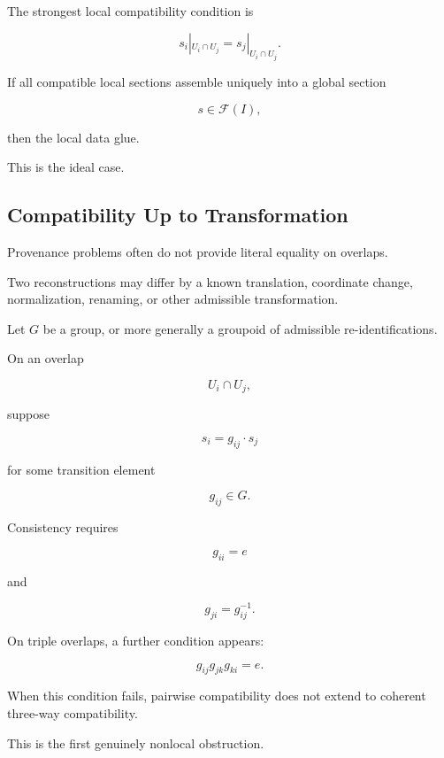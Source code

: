 \documentclass[
  11pt,
  a4paper,
  DIV=12,
  BCOR=0mm,
  parskip=half-
]{scrartcl}
\theoremstyle{definition}
\theoremstyle{plain}
\theoremstyle{remark}
\begin{document}
The strongest local compatibility condition is

\[
  s_i|_{U_i\cap U_j}
  =
  s_j|_{U_i\cap U_j}.
\]

If all compatible local sections assemble uniquely into a global section

\[
  s\in\mathscr F(I),
\]

then the local data glue.

This is the ideal case.


\subsection{Compatibility Up to Transformation}
\label{app:compatibility-up-to-transformation}

Provenance problems often do not provide literal equality on overlaps.

Two reconstructions may differ by a known translation, coordinate change,
normalization, renaming, or other admissible transformation.

Let \(G\) be a group, or more generally a groupoid of admissible
re-identifications.

On an overlap

\[
  U_i\cap U_j,
\]

suppose

\[
  s_i
  =
  g_{ij}\cdot s_j
\]

for some transition element

\[
  g_{ij}\in G.
\]

Consistency requires

\[
  g_{ii}=e
\]

and

\[
  g_{ji}=g_{ij}^{-1}.
\]

On triple overlaps, a further condition appears:

\[
  g_{ij}g_{jk}g_{ki}=e.
\]

When this condition fails, pairwise compatibility does not extend to coherent
three-way compatibility.

This is the first genuinely nonlocal obstruction.

\end{document}
